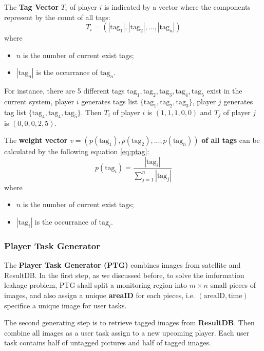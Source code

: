 \begin{definition}
\label{def:tagv}
The \textbf{Tag Vector} $T_i$ of player $i$ is indicated by a vector where the components represent by the count of all tags:
\[
  T_i = (|\text{tag}_1|, |\text{tag}_2|, ..., |\text{tag}_n|)
\]
where 
\begin{itemize}
\item $n$ is the number of current exist tags;
\item $|\text{tag}_n|$ is the occurrance of $\text{tag}_n$.
\end{itemize}
\end{definition}
For instance, there are 5 different tags $\text{tag}_1, \text{tag}_2, \text{tag}_3, \text{tag}_4, \text{tag}_5$ exist in the current system,
player $i$ generates tags list $\{\text{tag}_1, \text{tag}_2, \text{tag}_3\}$, player $j$ generates tag list
$\{\text{tag}_4, \text{tag}_4, \text{tag}_5\}$. Then $T_i$ of player $i$ is $(1, 1, 1, 0, 0)$ and $T_j$ of player $j$ is $(0, 0, 0, 2, 5)$.

\begin{definition}
\label{def:weightv}
The \textbf{weight vector} $v = (p(\text{tag}_1), p(\text{tag}_2), ..., p(\text{tag}_n))$ \textbf{of all tags} 
can be calculated by the following equation \ref{eq:ptag}:
\begin{equation}
\label{eq:ptag}
p(\text{tag}_i) = \frac{|\text{tag}_i|}{\sum_{j=1}^{n}{|\text{tag}_j|}}
\end{equation}
where
\begin{itemize}
\item $n$ is the number of current exist tags;
\item $|\text{tag}_i|$ is the occurrance of $\text{tag}_i$.
\end{itemize}
\end{definition}

\subsubsection{Player Task Generator}

The \textbf{Player Task Generator (PTG)} combines images from satellite and ResultDB. 
In the first step, as we discussed before, to solve the imformation leakage problem,
PTG shall split a monitoring region into $m\times n$ small pieces of images, and also assign a 
unique \textbf{areaID} for each pieces, i.e. $(\text{areaID}, \text{time})$ 
specifice a unique image for user tasks. 

The second generating step is to retrieve tagged images from \textbf{ResultDB}. Then combine
all images as a user task assign to a new upcoming player. Each user task contains 
half of untagged pictures and half of tagged images.

